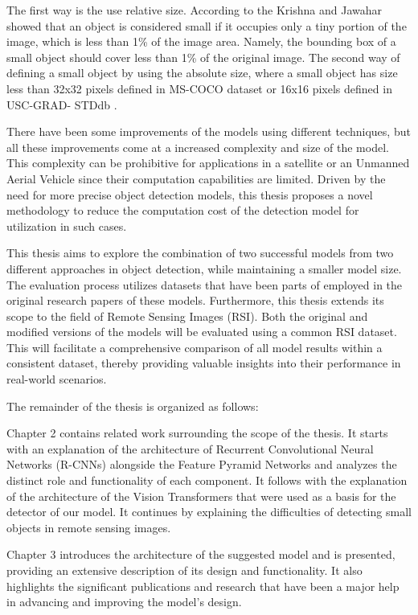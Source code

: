 \newpage
The first way is the use relative size. According to the Krishna and Jawahar \cite{small1} showed that an object is considered small if it occupies only a tiny portion of the image, which is less than 
1\% of the image area. Namely, the bounding box of a small object should cover less than 1\% of the original image. The second way of defining a small 
object by using the absolute size, where a small object has size less than 32x32 pixels defined in MS-COCO dataset or 16x16 pixels defined in 
USC-GRAD- STDdb \cite{small2}.

There have been some improvements of the models using different techniques, but all these improvements come at a increased complexity and size of the model. 
This complexity can be prohibitive for applications in a satellite or an Unmanned Aerial Vehicle since their computation capabilities are limited. 
Driven by the need for more precise object detection models, this thesis proposes a novel methodology to reduce the computation cost of the detection model 
for utilization in such cases.

This thesis aims to explore the combination of two successful models from two different approaches in object detection, while maintaining a smaller
model size. The evaluation process utilizes datasets that have been parts of employed in the original research papers of these models. 
Furthermore, this thesis extends its scope to the field of Remote Sensing Images (RSI). Both the original and modified versions 
of the models will be evaluated using a common RSI dataset. This will facilitate a comprehensive comparison of all model results within a consistent dataset, 
thereby providing valuable insights into their performance in real-world scenarios.


The remainder of the thesis is organized as follows:

Chapter 2 contains related work surrounding the scope of the thesis. It starts with an explanation of the architecture of Recurrent Convolutional Neural Networks
(R-CNNs) alongside the Feature Pyramid Networks and analyzes the distinct role and functionality of each component. It follows with the explanation of the 
architecture of the Vision Transformers that were used as a basis for the detector of our model. It continues by explaining the difficulties of detecting 
small objects in remote sensing images.

Chapter 3 introduces the architecture of the suggested model and is presented, providing an extensive description of its design and 
functionality. It also highlights the significant publications and research that have been a major help in advancing and improving the model's design.


